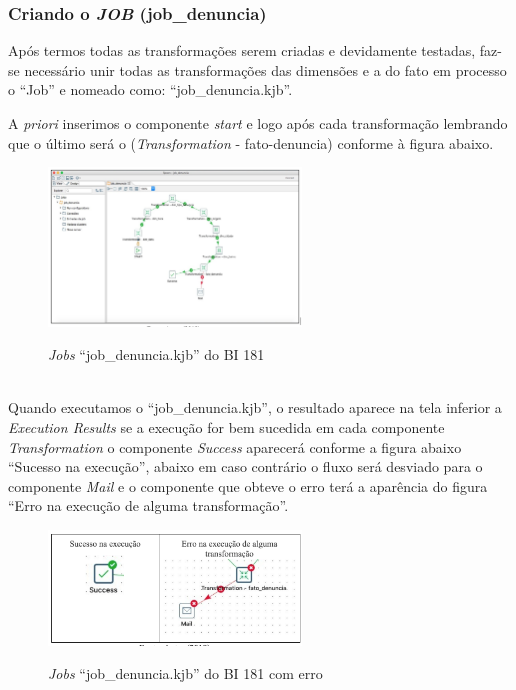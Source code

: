 \subsubsection{Criando o \textit{JOB} (job\_denuncia)}

Ap\'os termos todas as transforma\c{c}\~{o}es serem criadas e devidamente testadas, faz-se necess\'{a}rio unir 
todas as transforma\c{c}\~{o}es das dimens\~{o}es e a do fato em processo o ``Job'' e nomeado como: ``job\_denuncia.kjb''. 

A \textit{priori} inserimos o componente \textit{start} e logo ap\'os cada transforma\c{c}\~{a}o lembrando que o último 
ser\'{a} o (\textit{Transformation} - fato-denuncia) conforme \`{a} figura abaixo.

\begin{figure}[H]
	\vspace*{0,2cm}
    \centering
    \caption{\textit{Jobs} ``job\_denuncia.kjb'' do BI 181}
    \includegraphics[width=0.6\textwidth]{./04-figuras/figura-job-denuncia}
    \label{fig:ilustfigjobdenuncia}
\end{figure}
\vspace*{-0,9cm}
{\raggedright {}} \\

Quando executamos o ``job\_denuncia.kjb'', o resultado aparece na tela inferior a \textit{Execution Results} se a execu\c{c}\~{a}o 
for bem sucedida em cada componente \textit{Transformation} o  componente \textit{Success} aparecer\'{a} conforme a 
figura abaixo ``Sucesso na execu\c{c}\~{a}o'', abaixo em caso contr\'{a}rio o fluxo ser\'{a} desviado para o 
componente \textit{Mail} e o componente que obteve o erro ter\'{a} a apar\^{e}ncia do figura ``Erro na execu\c{c}\~{a}o de 
alguma transforma\c{c}\~{a}o''.

\begin{figure}[H]
	\vspace*{0,2cm}
    \centering
    \caption{\textit{Jobs}  ``job\_denuncia.kjb'' do BI 181 com erro}
    \includegraphics[width=0.6\textwidth]{./04-figuras/figura-job-denuncia-erro}
    \label{fig:ilustfigjobdenunciaerro}
\end{figure}
\vspace*{-0,9cm}
{\raggedright {}} \\


